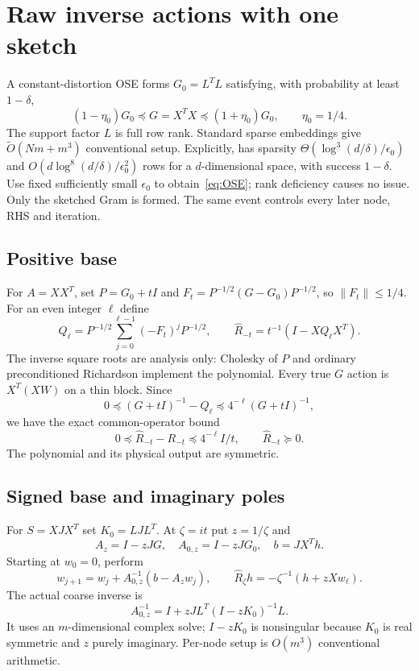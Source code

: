 \documentclass[11pt]{article}
\numberwithin{equation}{section}
\begin{document}
\section{Raw inverse actions with one sketch}

A constant-distortion OSE forms $G_0=L^TL$ satisfying, with probability
at least $1-\delta$,
\begin{equation}\label{eq:OSE}
 (1-\eta_0)G_0\preceq G=X^TX\preceq(1+\eta_0)G_0,
 \qquad\eta_0=1/4.
\end{equation}
The support factor $L$ is full row rank. Standard sparse embeddings
give $\widetilde O(Nm+m^3)$ conventional setup. Explicitly,
\cite[Theorem 9]{NN} has sparsity
$\Theta(\log^3(d/\delta)/\epsilon_0)$ and
$O(d\log^8(d/\delta)/\epsilon_0^2)$ rows for a $d$-dimensional
space, with success $1-\delta$. Use fixed sufficiently small
$\epsilon_0$ to obtain~\eqref{eq:OSE}; rank deficiency causes no issue.
Only the sketched Gram is formed. The same event controls every later
node, RHS and iteration.

\subsection*{Positive base}
For $A=XX^T$, set $P=G_0+tI$ and
$F_t=P^{-1/2}(G-G_0)P^{-1/2}$, so $\|F_t\|\le1/4$.
For an even integer $\ell$ define
\[
 Q_\ell=P^{-1/2}\sum_{j=0}^{\ell-1}(-F_t)^jP^{-1/2},\qquad
 \widehat R_{-t}=t^{-1}(I-XQ_\ell X^T).
\]
The inverse square roots are analysis only: Cholesky of $P$ and ordinary
preconditioned Richardson implement the polynomial. Every true
$G$ action is $X^T(XW)$ on a thin block. Since
\[
 0\preceq(G+tI)^{-1}-Q_\ell
          \preceq4^{-\ell}(G+tI)^{-1},
\]
we have the exact common-operator bound
\begin{equation}\label{eq:positiveR}
 0\preceq\widehat R_{-t}-R_{-t}\preceq4^{-\ell}I/t,
 \qquad \widehat R_{-t}\succeq0.
\end{equation}
The polynomial and its physical output are symmetric.

\subsection*{Signed base and imaginary poles}
For $S=XJX^T$ set $K_0=LJL^T$. At $\zeta=it$ put $z=1/\zeta$ and
\[
 A_z=I-zJG,\quad A_{0,z}=I-zJG_0,\quad b=JX^Th.
\]
Starting at $w_0=0$, perform
\begin{equation}\label{eq:Richardson}
 w_{j+1}=w_j+A_{0,z}^{-1}(b-A_zw_j),\qquad
 \widehat R_\zeta h=-\zeta^{-1}(h+zXw_\ell).
\end{equation}
The actual coarse inverse is
\[
 A_{0,z}^{-1}=I+zJL^T(I-zK_0)^{-1}L.
\]
It uses an $m$-dimensional complex solve; $I-zK_0$ is nonsingular
because $K_0$ is real symmetric and $z$ purely imaginary. Per-node
setup is $O(m^3)$ conventional arithmetic.
\end{document}
